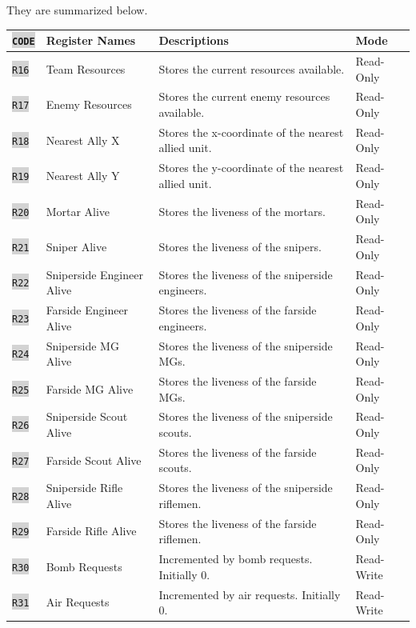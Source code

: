 \documentclass{article}
\newcommand{\vnscode}[1]{\colorbox{lightgray}{\lstinline[language=vns]{#1}}}
\begin{document}
They are summarized below.

\begin{minipage}{\textwidth}
\centering
\begin{tabular}{llll}
    \hline \vnscode{CODE} & Register Names & Descriptions & Mode \\ \hline
    \vnscode{R16} & Team Resources & Stores the current resources available. & Read-Only \\
    \vnscode{R17} & Enemy Resources & Stores the current enemy resources available. & Read-Only \\
    \vnscode{R18} & Nearest Ally X & Stores the x-coordinate of the nearest allied unit. & Read-Only \\
    \vnscode{R19} & Nearest Ally Y & Stores the y-coordinate of the nearest allied unit. & Read-Only \\
    \vnscode{R20} & Mortar Alive & Stores the liveness of the mortars. & Read-Only \\
    \vnscode{R21} & Sniper Alive & Stores the liveness of the snipers. & Read-Only \\
    \vnscode{R22} & Sniperside Engineer Alive & Stores the liveness of the sniperside engineers. & Read-Only \\
    \vnscode{R23} & Farside Engineer Alive & Stores the liveness of the farside engineers. & Read-Only \\
    \vnscode{R24} & Sniperside MG Alive & Stores the liveness of the sniperside MGs. & Read-Only \\
    \vnscode{R25} & Farside MG Alive & Stores the liveness of the farside MGs. & Read-Only \\
    \vnscode{R26} & Sniperside Scout Alive & Stores the liveness of the sniperside scouts. & Read-Only \\
    \vnscode{R27} & Farside Scout Alive & Stores the liveness of the farside scouts. & Read-Only \\
    \vnscode{R28} & Sniperside Rifle Alive & Stores the liveness of the sniperside riflemen. & Read-Only \\
    \vnscode{R29} & Farside Rifle Alive & Stores the liveness of the farside riflemen. & Read-Only \\
    \vnscode{R30} & Bomb Requests & Incremented by bomb requests. Initially 0. & Read-Write \\
    \vnscode{R31} & Air Requests & Incremented by air requests. Initially 0. & Read-Write \\
\end{tabular}
\end{minipage}
\end{document}
